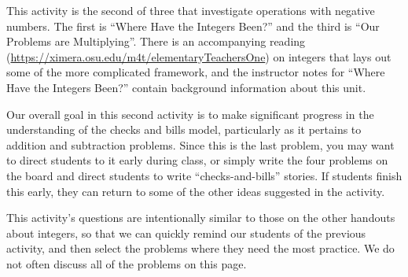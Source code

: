 \documentclass{ximera}
\begin{document}
\newpage
\begin{instructorNotes}
This activity is the second of three that investigate operations with negative numbers.  The first is ``Where Have the Integers Been?'' and the third is ``Our Problems are Multiplying''.  There is an accompanying reading (\url{https://ximera.osu.edu/m4t/elementaryTeachersOne}) on integers that lays out some of the more complicated framework, and the instructor notes for ``Where Have the Integers Been?'' contain background information about this unit.

Our overall goal in this second activity is to make significant progress in the understanding of the checks and bills model, particularly as it pertains to addition and subtraction problems. Since this is the last problem, you may want to direct students to it early during class, or simply write the four problems on the board and direct students to write ``checks-and-bills'' stories. If students finish this early, they can return to some of the other ideas suggested in the activity.

This activity's questions are intentionally similar to those on the other handouts about integers, so that we can quickly remind our students of the previous activity, and then select the problems where they need the most practice.  We do not often discuss all of the problems on this page.


\end{instructorNotes}
\end{document}
